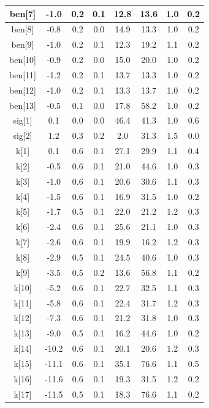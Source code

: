 \begin{longtable}{|c|c|c|c|c|c|c|c|}
\hline
ben[7] & -1.0 & 0.2 & 0.1 & 12.8 & 13.6 & 1.0 & 0.2 \\
\hline
ben[8] & -0.8 & 0.2 & 0.0 & 14.9 & 13.3 & 1.0 & 0.2 \\
\hline
ben[9] & -1.0 & 0.2 & 0.1 & 12.3 & 19.2 & 1.1 & 0.2 \\
\hline
ben[10] & -0.9 & 0.2 & 0.0 & 15.0 & 20.0 & 1.0 & 0.2 \\
\hline
ben[11] & -1.2 & 0.2 & 0.1 & 13.7 & 13.3 & 1.0 & 0.2 \\
\hline
ben[12] & -1.0 & 0.2 & 0.1 & 13.3 & 13.7 & 1.0 & 0.2 \\
\hline
ben[13] & -0.5 & 0.1 & 0.0 & 17.8 & 58.2 & 1.0 & 0.2 \\
\hline
sig[1] & 0.1 & 0.0 & 0.0 & 46.4 & 41.3 & 1.0 & 0.6 \\
\hline
sig[2] & 1.2 & 0.3 & 0.2 & 2.0 & 31.3 & 1.5 & 0.0 \\
\hline
k[1] & 0.1 & 0.6 & 0.1 & 27.1 & 29.9 & 1.1 & 0.4 \\
\hline
k[2] & -0.5 & 0.6 & 0.1 & 21.0 & 44.6 & 1.0 & 0.3 \\
\hline
k[3] & -1.0 & 0.6 & 0.1 & 20.6 & 30.6 & 1.1 & 0.3 \\
\hline
k[4] & -1.5 & 0.6 & 0.1 & 16.9 & 31.5 & 1.0 & 0.2 \\
\hline
k[5] & -1.7 & 0.5 & 0.1 & 22.0 & 21.2 & 1.2 & 0.3 \\
\hline
k[6] & -2.4 & 0.6 & 0.1 & 25.6 & 21.1 & 1.0 & 0.3 \\
\hline
k[7] & -2.6 & 0.6 & 0.1 & 19.9 & 16.2 & 1.2 & 0.3 \\
\hline
k[8] & -2.9 & 0.5 & 0.1 & 24.5 & 40.6 & 1.0 & 0.3 \\
\hline
k[9] & -3.5 & 0.5 & 0.2 & 13.6 & 56.8 & 1.1 & 0.2 \\
\hline
k[10] & -5.2 & 0.6 & 0.1 & 22.7 & 32.5 & 1.1 & 0.3 \\
\hline
k[11] & -5.8 & 0.6 & 0.1 & 22.4 & 31.7 & 1.2 & 0.3 \\
\hline
k[12] & -7.3 & 0.6 & 0.1 & 21.2 & 31.8 & 1.0 & 0.3 \\
\hline
k[13] & -9.0 & 0.5 & 0.1 & 16.2 & 44.6 & 1.0 & 0.2 \\
\hline
k[14] & -10.2 & 0.6 & 0.1 & 20.1 & 20.6 & 1.2 & 0.3 \\
\hline
k[15] & -11.1 & 0.6 & 0.1 & 35.1 & 76.6 & 1.1 & 0.5 \\
\hline
k[16] & -11.6 & 0.6 & 0.1 & 19.3 & 31.5 & 1.2 & 0.2 \\
\hline
k[17] & -11.5 & 0.5 & 0.1 & 18.3 & 76.6 & 1.1 & 0.2 \\

\end{longtable}
